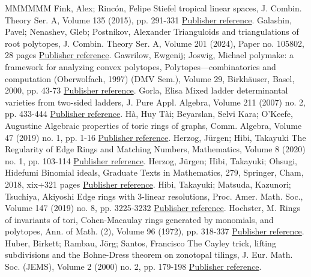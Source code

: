 \begin{thebibliography}{MMMMMM}
 Fink, Alex; Rincón, Felipe Stiefel tropical linear spaces, J. Combin. Theory Ser. A, Volume 135 (2015), pp. 291-331 \href{https://alco.centre-mersenne.org/articles/10.5802/alco.404/#fink2015stiefel}{Publisher reference}.
 Galashin, Pavel; Nenashev, Gleb; Postnikov, Alexander Trianguloids and triangulations of root polytopes, J. Combin. Theory Ser. A, Volume 201 (2024), Paper no. 105802, 28 pages \href{https://alco.centre-mersenne.org/articles/10.5802/alco.404/#galashin2018trianguloids}{Publisher reference}.
 Gawrilow, Ewgenij; Joswig, Michael polymake: a framework for analyzing convex polytopes, Polytopes—combinatorics and computation (Oberwolfach, 1997) (DMV Sem.), Volume 29, Birkhäuser, Basel, 2000, pp. 43-73 \href{https://alco.centre-mersenne.org/articles/10.5802/alco.404/#polymake:2000}{Publisher reference}.
 Gorla, Elisa Mixed ladder determinantal varieties from two-sided ladders, J. Pure Appl. Algebra, Volume 211 (2007) no. 2, pp. 433-444 \href{https://alco.centre-mersenne.org/articles/10.5802/alco.404/#gorla2007mixed}{Publisher reference}.
 Hà, Huy Tài; Beyarslan, Selvi Kara; O’Keefe, Augustine Algebraic properties of toric rings of graphs, Comm. Algebra, Volume 47 (2019) no. 1, pp. 1-16 \href{https://alco.centre-mersenne.org/articles/10.5802/alco.404/#ha2019}{Publisher reference}.
 Herzog, Jürgen; Hibi, Takayuki The Regularity of Edge Rings and Matching Numbers, Mathematics, Volume 8 (2020) no. 1, pp. 103-114 \href{https://alco.centre-mersenne.org/articles/10.5802/alco.404/#herzog2020regularity}{Publisher reference}.
 Herzog, Jürgen; Hibi, Takayuki; Ohsugi, Hidefumi Binomial ideals, Graduate Texts in Mathematics, 279, Springer, Cham, 2018, xix+321 pages \href{https://alco.centre-mersenne.org/articles/10.5802/alco.404/#HHOBinomial}{Publisher reference}.
 Hibi, Takayuki; Matsuda, Kazunori; Tsuchiya, Akiyoshi Edge rings with 3-linear resolutions, Proc. Amer. Math. Soc., Volume 147 (2019) no. 8, pp. 3225-3232 \href{https://alco.centre-mersenne.org/articles/10.5802/alco.404/#hibi3linear2019}{Publisher reference}.
 Hochster, M. Rings of invariants of tori, Cohen-Macaulay rings generated by monomials, and polytopes, Ann. of Math. (2), Volume 96 (1972), pp. 318-337 \href{https://alco.centre-mersenne.org/articles/10.5802/alco.404/#hochster1972}{Publisher reference}.
 Huber, Birkett; Rambau, Jörg; Santos, Francisco The Cayley trick, lifting subdivisions and the Bohne-Dress theorem on zonotopal tilings, J. Eur. Math. Soc. (JEMS), Volume 2 (2000) no. 2, pp. 179-198 \href{https://alco.centre-mersenne.org/articles/10.5802/alco.404/#huber2000cayley}{Publisher reference}.

\end{thebibliography}
